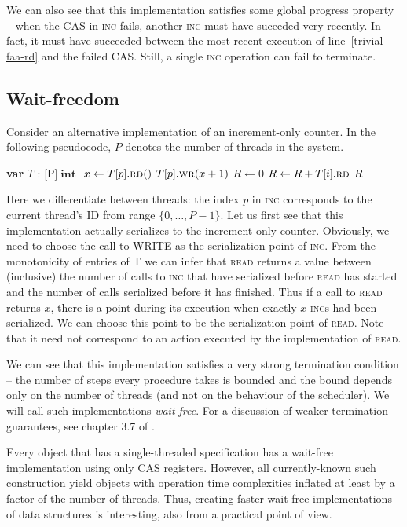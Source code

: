 \documentclass[a4paper,11pt]{article}
\def\int{\ensuremath{\operatorname{\textbf{int}}}}
\newcommand{\fn}[1]{\textsc{#1}}
\newcommand{\var}[2]{\textbf{var }#1 : #2}
\newcommand{\arrayspec}[1]{\text{array}[#1]\text{ of }}
\begin{document}
We can also see that this implementation satisfies some global progress property -- when the CAS in \fn{inc} fails,
another \fn{inc} must have suceeded very recently. In fact, it must have succeeded between the most recent execution
of line~\ref{trivial-faa-rd} and the failed CAS. Still, a single \fn{inc} operation can fail to terminate.

\subsection{Wait-freedom}

Consider an alternative implementation of an increment-only counter. In the following pseudocode, $P$ denotes
the number of threads in the system.

\begin{algorithmic}[1]
	\State\var{$T$}{\arrayspec{P}$\int$} \Comment{T is an array of $P$ CAS objects of type \int}
	\State $x \gets T[p].\fn{rd}()$
	\State $T[p].\fn{wr}(x + 1)$
\EndFunction
{}
	\State $R \gets 0$
	\State $R \gets R + T[i].\fn{rd}$
	\EndFor
	\State\Return $R$
\EndFunction
\end{algorithmic}

Here we differentiate between threads: the index $p$ in \fn{inc} corresponds to the current thread's ID from range
$\{0, \ldots, P-1\}$. Let us first see that this implementation actually serializes to the increment-only counter.
Obviously, we need to choose the call to WRITE as the serialization point of \fn{inc}. From the monotonicity
of entries of T we can infer that \fn{read} returns a value between (inclusive) the number of calls to \fn{inc} that have
serialized before \fn{read} has started and the number of calls serialized before it has finished.
Thus if a call to \fn{read} returns $x$, there is a point during its
execution when exactly $x$ \fn{inc}s had been serialized. We can choose this point to be the serialization point of
\fn{read}. Note that it need not correspond to an action executed by the implementation of \fn{read}.

We can see that this implementation satisfies a very strong termination condition -- the number of steps every
procedure takes is bounded and the bound depends only on the number of threads (and not on the behaviour of
the scheduler). We will call such implementations \emph{wait-free}. For a discussion of weaker
termination guarantees, see chapter 3.7 of \cite{TheArt}.

Every object that has a single-threaded specification has a wait-free implementation\cite{cas-univ} using
only CAS registers.
However, all currently-known such construction yield objects with operation time complexities inflated at least by a factor
of the number of threads.
Thus, creating faster wait-free implementations of data structures is interesting, also from a practical
point of view.
\end{document}
